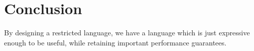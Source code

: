 \section{Conclusion}
\label{s:Conclusion}

By designing a restricted language, we have a language which is just expressive enough to be useful, while retaining important performance guarantees.


